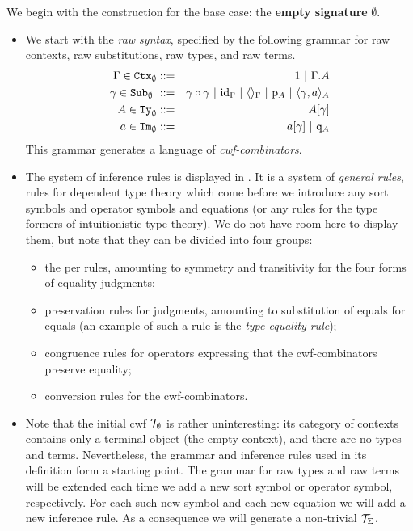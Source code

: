 \documentclass{lmcs}
\def\id{\mathrm{id}}
\begin{document}
We begin with the construction for the base case: the {\bf empty signature} $\emptyset$.
\begin{itemize}
\item
We start with the {\em raw syntax}, specified by the following grammar for raw contexts, raw substitutions, raw types, and raw terms.
\begin{eqnarray*}
\Gamma \in \RawCtx_\emptyset &::=& 1  \ |\ \Gamma\cext A\\
\gamma \in \RawSub_\emptyset  \ &::=& \gamma \circ \gamma \ |\ \id_\Gamma \ |\ \langle\rangle_\Gamma \ |\ \p_{A} \ |\ \langle \gamma, a \rangle_A\\
A \in \RawTy_\emptyset  &::=& A[\gamma]\\
a \in \RawTm_\emptyset  &::=& a[\gamma] \ |\ \qI_A
\end{eqnarray*}
This grammar generates a language of {\em cwf-combinators}.
\item
The system of inference rules is displayed in \cite{castellan:tlca2015,castellan:lmcs}. It is a system of {\em general rules}, rules for dependent type theory which come before we introduce any sort symbols and operator symbols and equations (or any rules for the type formers of intuitionistic type theory). We do not have room here to display them, but note that they can be divided into four groups:
\begin{itemize}
\item the per rules, amounting to symmetry and transitivity for the four forms of equality judgments;
\item preservation rules for judgments, amounting to substitution of equals for equals (an example of such a rule is the {\em type equality rule});
\item congruence rules for operators expressing that the cwf-combinators preserve equality;
\item conversion rules for the cwf-combinators.
\end{itemize}
\item
Note that the initial cwf ${\mathcal T}_\emptyset$ is rather uninteresting: its category of contexts contains only a terminal object (the empty context), and there are no types and terms. Nevertheless, the grammar and inference rules used in its definition form a starting point. The grammar for raw types and raw terms will be extended each time we add a new sort symbol or operator symbol, respectively. For each such new symbol and each new equation we will add a new inference rule. As a consequence we will generate a non-trivial ${\mathcal T}_\Sigma$.
\end{itemize}
\end{document}
